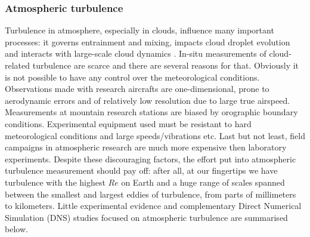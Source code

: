 \documentclass[../main.tex]{subfiles}
\begin{document}
\subsubsection{Atmospheric turbulence}
Turbulence in atmosphere, especially in clouds, influence many important processes: it governs entrainment and mixing, impacts cloud droplet evolution and interacts with large-scale cloud dynamics \citep{Bodenschatz2010}. In-situ measurements of cloud-related turbulence are scarce and there are several reasons for that. Obviously it is not possible to have any control over the meteorological conditions. Observations made with research aircrafts are one-dimensional, prone to aerodynamic errors and of relatively low resolution due to  large true airspeed. Measurements at mountain research stations are biased by orographic boundary conditions. Experimental equipment used must be resistant to hard meteorological conditions and large speeds/vibrations etc. Last but not least, field campaigns in atmospheric research are much more expensive then laboratory experiments. Despite these discouraging factors, the effort put into atmospheric turbulence measurement should pay off: after all, at our fingertips we have turbulence with the highest $Re$ on Earth and a huge range of scales spanned between the smallest and largest eddies of turbulence, from parts of millimeters to kilometers. Little experimental evidence and complementary Direct Numerical Simulation (DNS) studies focused on atmospheric turbulence are summarised below.\\
\end{document}
